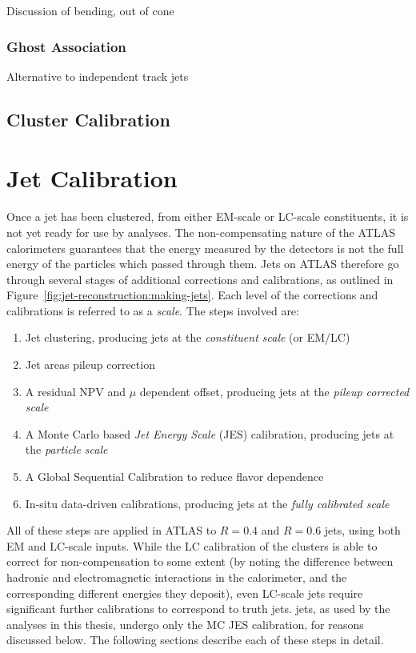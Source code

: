 Discussion of bending, out of cone

\subsubsection{Ghost Association}

Alternative to independent track jets

\subsection{Cluster Calibration}

\section{Jet Calibration}

Once a jet has been clustered, from either EM-scale or LC-scale constituents, it is not yet ready for use by analyses. The non-compensating nature of the ATLAS calorimeters guarantees that the energy measured by the detectors is not the full energy of the particles which passed through them. Jets on ATLAS therefore go through several stages of additional corrections and calibrations, as outlined in Figure~\ref{fig:jet-reconstruction:making-jets}. Each level of the corrections and calibrations is referred to as a \textit{scale}. The steps involved are:

\begin{enumerate}
	\item Jet clustering, producing jets at the \textit{constituent scale} (or EM/LC)
	\item Jet areas pileup correction
	\item A residual NPV and $\mu$ dependent offset, producing jets at the \textit{pileup corrected scale}
	\item A Monte Carlo based \textit{Jet Energy Scale} (JES) calibration, producing jets at the \textit{particle scale}
	\item A Global Sequential Calibration to reduce flavor dependence
	\item In-situ data-driven calibrations, producing jets at the \textit{fully calibrated scale}
\end{enumerate}

All of these steps are applied in ATLAS to $R=0.4$ and $R=0.6$ jets, using both EM and LC-scale inputs. While the LC calibration of the clusters is able to correct for non-compensation to some extent (by noting the difference between hadronic and electromagnetic interactions in the calorimeter, and the corresponding different energies they deposit), even LC-scale jets require significant further calibrations to correspond to truth jets. \LargeR jets, as used by the analyses in this thesis, undergo only the MC JES calibration, for reasons discussed below. The following sections describe each of these steps in detail.

